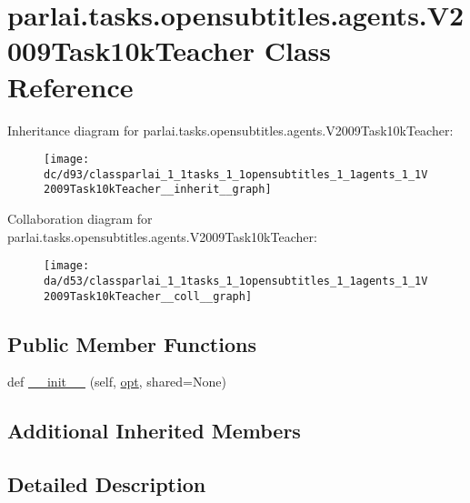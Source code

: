 \hypertarget{classparlai_1_1tasks_1_1opensubtitles_1_1agents_1_1V2009Task10kTeacher}{}\section{parlai.\+tasks.\+opensubtitles.\+agents.\+V2009\+Task10k\+Teacher Class Reference}
\label{classparlai_1_1tasks_1_1opensubtitles_1_1agents_1_1V2009Task10kTeacher}


Inheritance diagram for parlai.\+tasks.\+opensubtitles.\+agents.\+V2009\+Task10k\+Teacher\+:\nopagebreak
\begin{figure}[H]
\begin{center}
\leavevmode
\texttt{[image: dc/d93/classparlai\_1\_1tasks\_1\_1opensubtitles\_1\_1agents\_1\_1V2009Task10kTeacher\_\_inherit\_\_graph]}
\end{center}
\end{figure}


Collaboration diagram for parlai.\+tasks.\+opensubtitles.\+agents.\+V2009\+Task10k\+Teacher\+:\nopagebreak
\begin{figure}[H]
\begin{center}
\leavevmode
\texttt{[image: da/d53/classparlai\_1\_1tasks\_1\_1opensubtitles\_1\_1agents\_1\_1V2009Task10kTeacher\_\_coll\_\_graph]}
\end{center}
\end{figure}
\subsection*{Public Member Functions}
\begin{DoxyCompactItemize}
\item 
def \hyperlink{classparlai_1_1tasks_1_1opensubtitles_1_1agents_1_1V2009Task10kTeacher_af0a8a8e3a7a2c7b7cea42965f8b08afc}{\+\_\+\+\_\+init\+\_\+\+\_\+} (self, \hyperlink{classparlai_1_1core_1_1teachers_1_1FbDialogTeacher_af7a9ec497b9cd0292d7b8fa220da7c28}{opt}, shared=None)
\end{DoxyCompactItemize}
\subsection*{Additional Inherited Members}


\subsection{Detailed Description}


